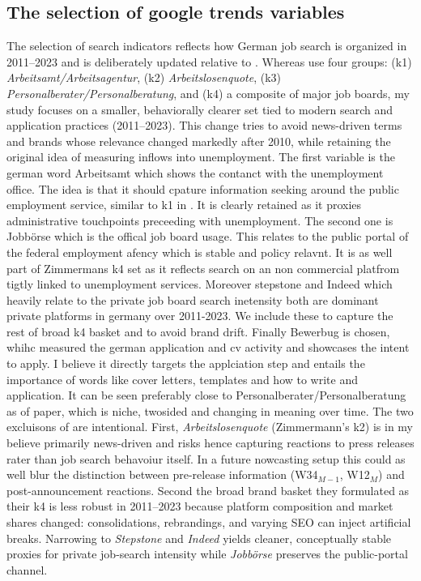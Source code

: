 \documentclass[12pt,a4paper]{article}
\begin{document}
\subsection{The selection of google trends variables}
The selection of search indicators reflects how German job search is organized in 2011–2023 and is deliberately updated relative to \cite{Zimmermann2009}. Whereas \textcite{Zimmermann2009} use four groups: (k1) \emph{Arbeitsamt/Arbeitsagentur}, (k2) \emph{Arbeitslosenquote}, (k3) \emph{Personalberater/Personalberatung}, and (k4) a composite of major job boards, my study focuses on a smaller, behaviorally clearer set tied to modern search and application practices (2011–2023).
This change tries to avoid news-driven terms and brands whose relevance changed markedly after 2010, while retaining the original idea of measuring inflows into unemployment.
The first variable is the german word Arbeitsamt which shows the contanct with the unemployment office. The idea is that it should cpature information seeking around the public employment service, similar to k1 in \cite{Askitas2009}.
It is clearly retained as it proxies administrative touchpoints preceeding with unemployment.
The second one is Jobbörse which is the offical job board usage. This relates to the public portal of the federal employment afency which is stable and policy relavnt. It is as well part of Zimmermans k4 set as it reflects search on an non commercial platfrom tigtly linked to unemployment services.
Moreover stepstone and Indeed which heavily relate to the private job board search inetensity both are dominant private platforms in germany over 2011-2023. We include these to capture the rest of \cite{Askitas2009} broad k4 basket and to avoid brand drift.
Finally Bewerbug is chosen, whihc measured the german application and cv activity and showcases the intent to apply.
I believe it directly targets the applciation step and entails the  importance of words like cover letters, templates and how to write and application. It can be seen preferably close to Personalberater/Personalberatung as of \cite{Askitas2009} paper, which is niche, twosided and changing in meaning over time. 
The two excluisons of are intentional. 
 First, \emph{Arbeitslosenquote} (Zimmermann’s k2) is in my believe primarily news-driven and risks hence capturing reactions to press releases rater than job search behavoiur itself.
 In a future nowcasting setup this could as well blur the distinction between pre-release information (W34$_{M-1}$, W12$_M$) and post-announcement reactions.
 Second the broad brand basket they formulated as their k4 
 is less robust in 2011–2023 because platform composition and market shares changed: consolidations, rebrandings, and varying SEO can inject artificial breaks. Narrowing to \emph{Stepstone} and \emph{Indeed} yields cleaner, conceptually stable proxies for private job-search intensity while \emph{Jobbörse} preserves the public-portal channel.
\end{document}
